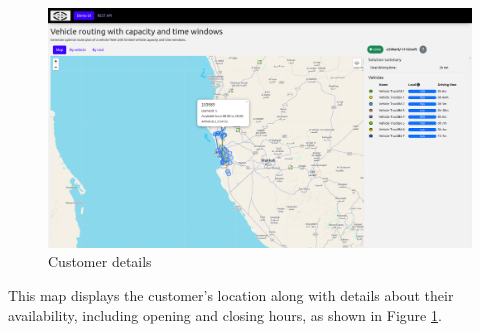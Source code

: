 \documentclass[a4paper,12pt, final]{article}
\begin{document}
\begin{figure}[htbp]
    \centering
    \includegraphics[width=\textwidth]{gfx/VRP_3.png}
    \caption{Customer details}
    \label{fig:VRP_3}
\end{figure}
This map displays the customer's location along with details about their availability, including opening and closing hours, as shown in Figure \ref{fig:VRP_3}.
\newpage
\end{document}
